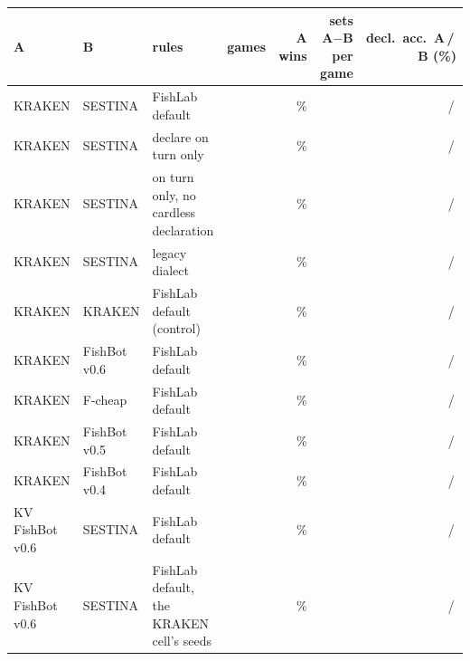 \begin{tabularx}{\linewidth}{Q{0.95}Q{1.0}Q{1.45}N{0.75}N{0.8}N{1.15}N{0.9}}
\toprule
A & B & rules & games & A wins & sets A$-$B per game & decl.\ acc.\ A\,/\,B (\%) \\
\midrule
KRAKEN & SESTINA & FishLab default & \kcEDefaultGames{} & \kcEDefaultWin{}\% & \ci{$\kcEDefaultMargin{}$}{\kcEDefaultMarginLo{},\,\kcEDefaultMarginHi{}} & \kcEDefaultDeclA{}\,/\,\kcEDefaultDeclB{} \\
KRAKEN & SESTINA & declare on turn only & \kcENoootGames{} & \kcENoootWin{}\% & \ci{$\kcENoootMargin{}$}{\kcENoootMarginLo{},\,\kcENoootMarginHi{}} & \kcENoootDeclA{}\,/\,\kcENoootDeclB{} \\
KRAKEN & SESTINA & on turn only, no cardless declaration & \kcENoootNcGames{} & \kcENoootNcWin{}\% & \ci{$\kcENoootNcMargin{}$}{\kcENoootNcMarginLo{},\,\kcENoootNcMarginHi{}} & \kcENoootNcDeclA{}\,/\,\kcENoootNcDeclB{} \\
KRAKEN & SESTINA & legacy dialect & \kcELegacyGames{} & \kcELegacyWin{}\% & \ci{$\kcELegacyMargin{}$}{\kcELegacyMarginLo{},\,\kcELegacyMarginHi{}} & \kcELegacyDeclA{}\,/\,\kcELegacyDeclB{} \\
\midrule
KRAKEN & KRAKEN & FishLab default (control) & \kcEMirrorGames{} & \kcEMirrorWin{}\% & \ci{$\kcEMirrorMargin{}$}{\kcEMirrorMarginLo{},\,\kcEMirrorMarginHi{}} & \kcEMirrorDeclA{}\,/\,\kcEMirrorDeclB{} \\
\midrule
KRAKEN & FishBot v0.6 & FishLab default & \kcEVsVsixGames{} & \kcEVsVsixWin{}\% & \ci{$\kcEVsVsixMargin{}$}{\kcEVsVsixMarginLo{},\,\kcEVsVsixMarginHi{}} & \kcEVsVsixDeclA{}\,/\,\kcEVsVsixDeclB{} \\
KRAKEN & F-cheap & FishLab default & \kcEVsFcheapGames{} & \kcEVsFcheapWin{}\% & \ci{$\kcEVsFcheapMargin{}$}{\kcEVsFcheapMarginLo{},\,\kcEVsFcheapMarginHi{}} & \kcEVsFcheapDeclA{}\,/\,\kcEVsFcheapDeclB{} \\
KRAKEN & FishBot v0.5 & FishLab default & \kcEVsVfiveGames{} & \kcEVsVfiveWin{}\% & \ci{$\kcEVsVfiveMargin{}$}{\kcEVsVfiveMarginLo{},\,\kcEVsVfiveMarginHi{}} & \kcEVsVfiveDeclA{}\,/\,\kcEVsVfiveDeclB{} \\
KRAKEN & FishBot v0.4 & FishLab default & \kcEVsVfourGames{} & \kcEVsVfourWin{}\% & \ci{$\kcEVsVfourMargin{}$}{\kcEVsVfourMarginLo{},\,\kcEVsVfourMarginHi{}} & \kcEVsVfourDeclA{}\,/\,\kcEVsVfourDeclB{} \\
\midrule
KV FishBot v0.6 & SESTINA & FishLab default & \kcEKvSixGames{} & \kcEKvSixWin{}\% & \ci{$\kcEKvSixMargin{}$}{\kcEKvSixMarginLo{},\,\kcEKvSixMarginHi{}} & \kcEKvSixDeclA{}\,/\,\kcEKvSixDeclB{} \\
KV FishBot v0.6 & SESTINA & FishLab default, the KRAKEN cell's seeds & \kcEKvSixPairedGames{} & \kcEKvSixPairedWin{}\% & \ci{$\kcEKvSixPairedMargin{}$}{\kcEKvSixPairedMarginLo{},\,\kcEKvSixPairedMarginHi{}} & \kcEKvSixPairedDeclA{}\,/\,\kcEKvSixPairedDeclB{} \\
\bottomrule
\end{tabularx}
